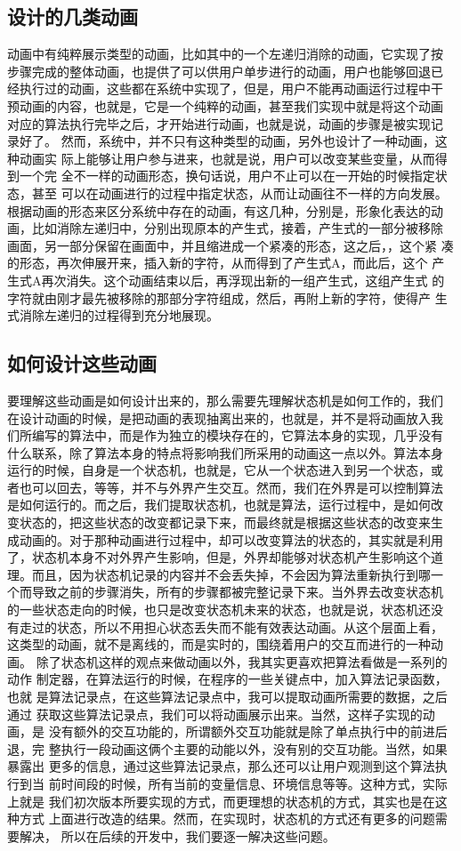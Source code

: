 \subsection{设计的几类动画}
动画中有纯粹展示类型的动画，比如其中的一个左递归消除的动画，它实现了按
步骤完成的整体动画，也提供了可以供用户单步进行的动画，用户也能够回退已
经执行过的动画，这些都在系统中实现了，但是，用户不能再动画运行过程中干
预动画的内容，也就是，它是一个纯粹的动画，甚至我们实现中就是将这个动画
对应的算法执行完毕之后，才开始进行动画，也就是说，动画的步骤是被实现记
录好了。
然而，系统中，并不只有这种类型的动画，另外也设计了一种动画，这种动画实
际上能够让用户参与进来，也就是说，用户可以改变某些变量，从而得到一个完
全不一样的动画形态，换句话说，用户不止可以在一开始的时候指定状态，甚至
可以在动画进行的过程中指定状态，从而让动画往不一样的方向发展。
根据动画的形态来区分系统中存在的动画，有这几种，分别是，形象化表达的动
画，比如消除左递归中，分别出现原本的产生式，接着，产生式的一部分被移除
画面，另一部分保留在画面中，并且缩进成一个紧凑的形态，这之后，，这个紧
凑的形态，再次伸展开来，插入新的字符，从而得到了产生式A，而此后，这个
产生式A再次消失。这个动画结束以后，再浮现出新的一组产生式，这组产生式
的字符就由刚才最先被移除的那部分字符组成，然后，再附上新的字符，使得产
生式消除左递归的过程得到充分地展现。
\subsection{如何设计这些动画}
要理解这些动画是如何设计出来的，那么需要先理解状态机是如何工作的，我们
在设计动画的时候，是把动画的表现抽离出来的，也就是，并不是将动画放入我
们所编写的算法中，而是作为独立的模块存在的，它算法本身的实现，几乎没有
什么联系，除了算法本身的特点将影响我们所采用的动画这一点以外。算法本身
运行的时候，自身是一个状态机，也就是，它从一个状态进入到另一个状态，或
者也可以回去，等等，并不与外界产生交互。然而，我们在外界是可以控制算法
是如何运行的。而之后，我们提取状态机，也就是算法，运行过程中，是如何改
变状态的，把这些状态的改变都记录下来，而最终就是根据这些状态的改变来生
成动画的。对于那种动画进行过程中，却可以改变算法的状态的，其实就是利用
了，状态机本身不对外界产生影响，但是，外界却能够对状态机产生影响这个道
理。而且，因为状态机记录的内容并不会丢失掉，不会因为算法重新执行到哪一
个而导致之前的步骤消失，所有的步骤都被完整记录下来。当外界去改变状态机
的一些状态走向的时候，也只是改变状态机未来的状态，也就是说，状态机还没
有走过的状态，所以不用担心状态丢失而不能有效表达动画。从这个层面上看，
这类型的动画，就不是离线的，而是实时的，围绕着用户的交互而进行的一种动
画。
除了状态机这样的观点来做动画以外，我其实更喜欢把算法看做是一系列的动作
制定器，在算法运行的时候，在程序的一些关键点中，加入算法记录函数，也就
是算法记录点，在这些算法记录点中，我可以提取动画所需要的数据，之后通过
获取这些算法记录点，我们可以将动画展示出来。当然，这样子实现的动画，是
没有额外的交互功能的，所谓额外交互功能就是除了单点执行中的前进后退，完
整执行一段动画这俩个主要的动能以外，没有别的交互功能。当然，如果暴露出
更多的信息，通过这些算法记录点，那么还可以让用户观测到这个算法执行到当
前时间段的时候，所有当前的变量信息、环境信息等等。这种方式，实际上就是
我们初次版本所要实现的方式，而更理想的状态机的方式，其实也是在这种方式
上面进行改造的结果。然而，在实现时，状态机的方式还有更多的问题需要解决，
所以在后续的开发中，我们要逐一解决这些问题。

